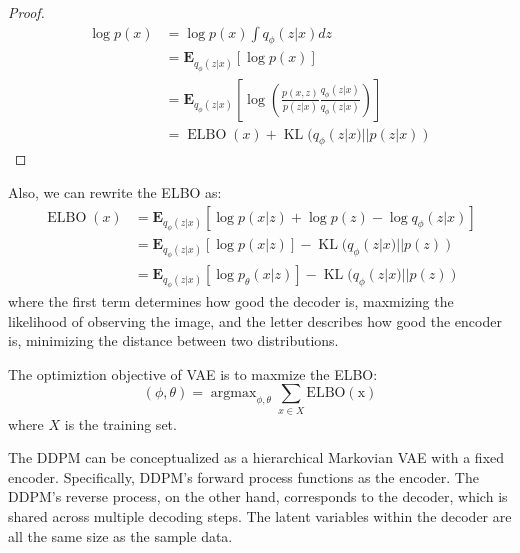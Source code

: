 \begin{proof}
    \begin{equation}
        \begin{aligned}
            \log p(x) & = \log p(x)\int q_\phi(z|x)dz\\
            &=\mathbf{E}_{q_\phi(z|x)}\left[\log p(x)\right]\\
            & = \mathbf{E}_{q_\phi(z|x)}\left[\log \left(\frac{p(x, z)}{p(z|x)}\frac{q_\phi(z|x)}{q_\phi(z|x)}\right)\right]\\
            & =\operatorname{ELBO}(x) + \operatorname{KL}(q_\phi(z|x)||p(z|x))
        \end{aligned}
    \end{equation}
\end{proof}

\begin{theorem}
    Also, we can rewrite the ELBO as:
    \begin{equation}
        \begin{aligned}
            \operatorname{ELBO}(x) &= \mathbf{E}_{q_\phi(z|x)}\left[\log p(x|z)+\log p(z)-\log q_\phi(z|x)\right]\\
            &= \mathbf{E}_{q_\phi(z|x)}\left[\log p(x|z)\right] - \operatorname{KL}(q_\phi(z|x)||p(z))\\
            &= \mathbf{E}_{q_\phi(z|x)}\left[\log p_\theta(x|z)\right] - \operatorname{KL}(q_\phi(z|x)||p(z))
        \end{aligned}
    \end{equation}
    where the first term determines how good the decoder is, maxmizing the likelihood of observing the image, 
    and the letter describes how good the encoder is, minimizing the distance between two distributions.
\end{theorem}

\begin{definition}
    The optimiztion objective of VAE is to maxmize the ELBO:
    \begin{equation}
        (\phi, \theta) = \operatorname{argmax}_{\phi, \theta} \sum_{x\in X} \operatorname{ELBO(x)}
    \end{equation}
    where $X$ is the training set.
\end{definition}
The DDPM can be conceptualized as a hierarchical Markovian VAE with a fixed encoder. Specifically, DDPM's  forward process functions as the encoder.
The DDPM’s reverse process, on the other hand, corresponds to the decoder, which is shared across multiple  decoding steps. The latent variables within the decoder are all the same size as the sample data.



